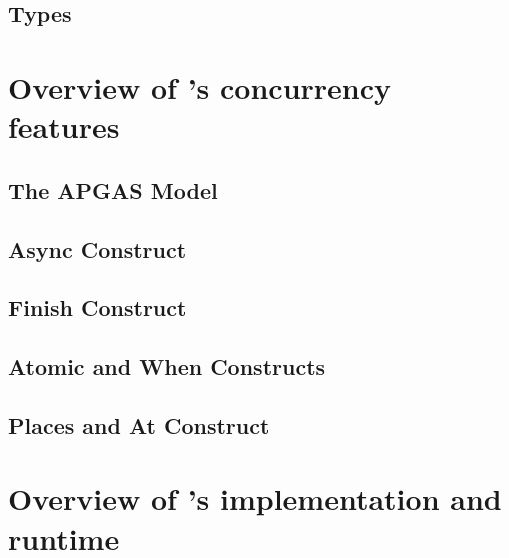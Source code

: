 \subsection{Types}

\section{Overview of \xten's concurrency features}

\subsection{The APGAS Model}

\subsection{Async Construct}

\subsection{Finish Construct}

\subsection{Atomic and When Constructs}

\subsection{Places and At Construct}

\section{Overview of \xten's implementation and runtime}
 


